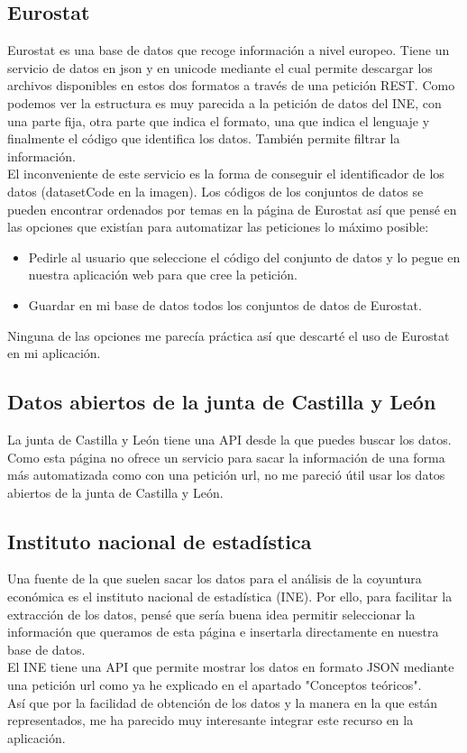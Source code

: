 \subsection{Eurostat}
Eurostat es una base de datos que recoge información a nivel europeo. Tiene un servicio de datos en json y en unicode mediante el cual permite descargar los archivos disponibles en estos dos formatos a través de una petición REST.
\cite{eurostat}
Como podemos ver la estructura es muy parecida a la petición de datos del INE, con una parte fija, otra parte que indica el formato, una que indica el lenguaje y finalmente el código que identifica los datos. También permite filtrar la información.\\
El inconveniente de este servicio es la forma de conseguir el identificador de los datos (datasetCode en la imagen).
Los códigos de los conjuntos de datos se pueden encontrar ordenados por temas en la página de Eurostat así que pensé en las opciones que existían para automatizar las peticiones lo máximo posible:
\begin{itemize}
    \item Pedirle al usuario que seleccione el código del conjunto de datos y lo pegue en nuestra aplicación web para que cree la petición.
    \item Guardar en mi base de datos todos los conjuntos de datos de Eurostat.
\end{itemize}
Ninguna de las opciones me parecía práctica así que descarté el uso de Eurostat en mi aplicación.
\subsection{Datos abiertos de la junta de Castilla y León}
La junta de Castilla y León tiene una API desde la que puedes buscar los datos.\cite{apijcyl}
Como esta página no ofrece un servicio para sacar la información de una forma más automatizada como con una petición url, no me pareció útil usar los datos abiertos de la junta de Castilla y León.
\subsection{Instituto nacional de estadística}
Una fuente de la que suelen sacar los datos para el análisis de la coyuntura económica es el instituto nacional de estadística (INE). Por ello, para facilitar la extracción de los datos, pensé que sería buena idea permitir seleccionar la información que queramos de esta página e insertarla directamente en nuestra base de datos.\\
El INE tiene una API que permite mostrar los datos en formato JSON mediante una petición url como ya he explicado en el apartado "Conceptos teóricos".\\
Así que por la facilidad de obtención de los datos y la manera en la que están representados, me ha parecido muy interesante integrar este recurso en la aplicación.

